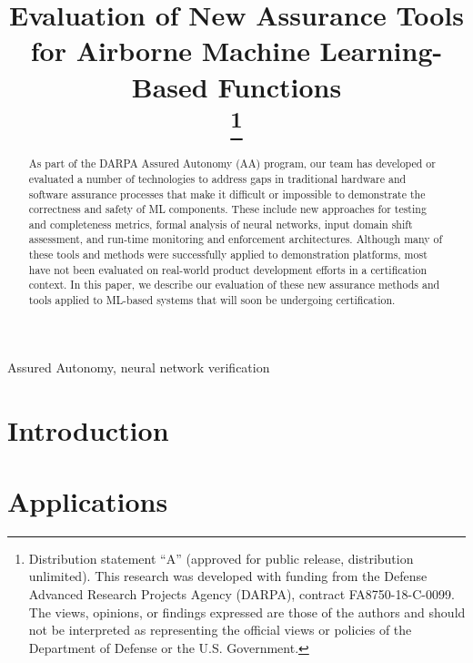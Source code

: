 \documentclass[conference]{IEEEtran}
\begin{document}
\title{Evaluation of New Assurance Tools for Airborne Machine Learning-Based Functions\\
\thanks{Distribution statement ``A'' (approved for public release, distribution unlimited). This research was developed with funding from the Defense Advanced Research Projects Agency (DARPA), contract FA8750-18-C-0099. The views, opinions, or findings expressed are those of the authors and should not be interpreted as representing the official views or policies of the Department of Defense or the U.S. Government.}
}

\author{
}

\maketitle

\begin{abstract}
As part of the DARPA Assured Autonomy (AA) program, our team has developed or evaluated a number of technologies to address gaps in traditional hardware and software assurance processes that make it difficult or impossible to demonstrate the correctness and safety of ML components.    These include new approaches for testing and completeness metrics, formal analysis of neural networks, input domain shift assessment, and run-time monitoring and enforcement architectures.  Although many of these tools and methods were successfully applied to demonstration platforms, most have not been evaluated on real-world product development efforts in a certification context.  In this paper, we describe our evaluation of these new assurance methods and tools applied to ML-based systems that will soon be undergoing certification.
\end{abstract}

\begin{IEEEkeywords}
Assured Autonomy, neural network verification
\end{IEEEkeywords}

\section{Introduction}
\label{sec:introduction}


\section{Applications}
\label{sec:applications}

\end{document}
